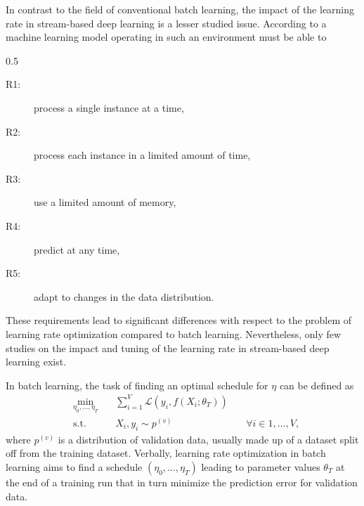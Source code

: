 \documentclass[letterpaper]{article} %
\begin{document}
In contrast to the field of conventional batch learning, the impact of the learning rate in stream-based deep learning is a lesser studied issue. According to \citet{bifetMOAMassiveOnline2010} a machine learning model operating in such an environment must be able to
\begin{center}
	\begin{varwidth}{0.5\textwidth}
		\begin{description}
			\item[R1:] process a single instance at a time,\label{rq:single_instance}
			\item[R2:] process each instance in a limited amount of time,\label{rq:limited_time}
			\item[R3:] use a limited amount of memory,\label{rq:limited_memory}
			\item[R4:] predict at any time,\label{rq:predict_any_time}
			\item[R5:] adapt to changes in the data distribution.\label{rq:adapt_to_drift}
		\end{description}
	\end{varwidth}
\end{center}
These requirements lead to significant differences with respect to the problem of learning rate optimization compared to batch learning.
Nevertheless, only few studies on the impact and tuning of the learning rate in stream-based deep learning exist.


In batch learning, the task of finding an optimal schedule for $\eta$ can be defined as
\begin{equation}
	\label{eq:batch_lr_optim}
	\begin{alignedat}{3}
		& \!\min_{\eta_0, \ldots, \eta_T} & \, & \sum_{i=1}^{V}\mathcal{L}(y_i, f(X_i; \theta_T)) &    &                              \\
		& \text{s.t.}                     &    & X_i, y_i  \sim p^{(v)}                           & \  & \forall i \in {1, \ldots, V}
		,
	\end{alignedat}
\end{equation}
where $p^{(v)}$ is a distribution of validation data, usually made up of a dataset split off from the training dataset.
Verbally, learning rate optimization in batch learning aims to find a schedule $(\eta_0, \ldots, \eta_T)$ leading to parameter values $\theta_T$ at the end of a training run that in turn minimize the prediction error for validation data.
\end{document}
